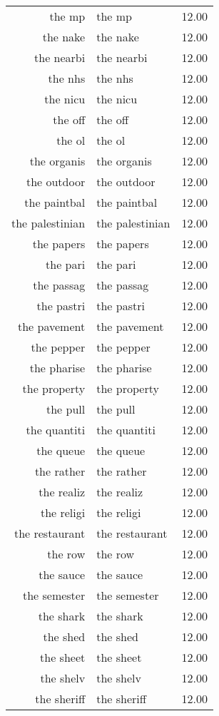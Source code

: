 \begin{table}[ht]
\begin{tabular}{rlr}
  the mp & the mp & 12.00 \\ 
  the nake & the nake & 12.00 \\ 
  the nearbi & the nearbi & 12.00 \\ 
  the nhs & the nhs & 12.00 \\ 
  the nicu & the nicu & 12.00 \\ 
  the off & the off & 12.00 \\ 
  the ol & the ol & 12.00 \\ 
  the organis & the organis & 12.00 \\ 
  the outdoor & the outdoor & 12.00 \\ 
  the paintbal & the paintbal & 12.00 \\ 
  the palestinian & the palestinian & 12.00 \\ 
  the papers & the papers & 12.00 \\ 
  the pari & the pari & 12.00 \\ 
  the passag & the passag & 12.00 \\ 
  the pastri & the pastri & 12.00 \\ 
  the pavement & the pavement & 12.00 \\ 
  the pepper & the pepper & 12.00 \\ 
  the pharise & the pharise & 12.00 \\ 
  the property & the property & 12.00 \\ 
  the pull & the pull & 12.00 \\ 
  the quantiti & the quantiti & 12.00 \\ 
  the queue & the queue & 12.00 \\ 
  the rather & the rather & 12.00 \\ 
  the realiz & the realiz & 12.00 \\ 
  the religi & the religi & 12.00 \\ 
  the restaurant & the restaurant & 12.00 \\ 
  the row & the row & 12.00 \\ 
  the sauce & the sauce & 12.00 \\ 
  the semester & the semester & 12.00 \\ 
  the shark & the shark & 12.00 \\ 
  the shed & the shed & 12.00 \\ 
  the sheet & the sheet & 12.00 \\ 
  the shelv & the shelv & 12.00 \\ 
  the sheriff & the sheriff & 12.00 \\ 

\end{tabular}
\end{table}
